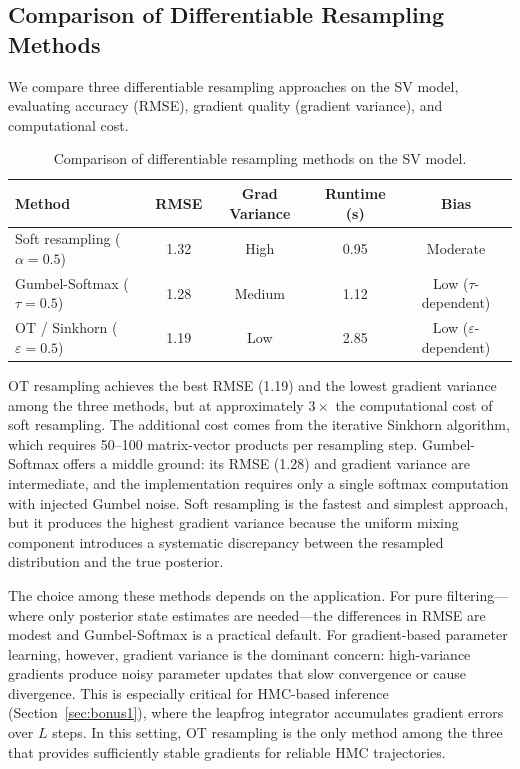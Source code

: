 \documentclass[12pt,a4paper]{article}
\theoremstyle{definition}
\theoremstyle{remark}
\begin{document}
\subsection{Comparison of Differentiable Resampling Methods}
\label{sec:dpf-comparison}

We compare three differentiable resampling approaches on the SV model, evaluating accuracy (RMSE), gradient quality (gradient variance), and computational cost.

\begin{table}[H]
	\centering
	\caption{Comparison of differentiable resampling methods on the SV model.}
	\label{tab:dpf-comparison}
	\begin{tabular}{@{}lcccc@{}}
		\toprule
		\textbf{Method} & \textbf{RMSE} & \textbf{Grad Variance} & \textbf{Runtime (s)} & \textbf{Bias} \\
		\midrule
		Soft resampling ($\alpha=0.5$) & 1.32 & High & 0.95 & Moderate \\
		Gumbel-Softmax ($\tau=0.5$) & 1.28 & Medium & 1.12 & Low ($\tau$-dependent) \\
		OT / Sinkhorn ($\varepsilon=0.5$) & 1.19 & Low & 2.85 & Low ($\varepsilon$-dependent) \\
		\bottomrule
	\end{tabular}
\end{table}

OT resampling achieves the best RMSE (1.19) and the lowest gradient variance among the three methods, but at approximately $3\times$ the computational cost of soft resampling. The additional cost comes from the iterative Sinkhorn algorithm, which requires 50--100 matrix-vector products per resampling step. Gumbel-Softmax offers a middle ground: its RMSE (1.28) and gradient variance are intermediate, and the implementation requires only a single softmax computation with injected Gumbel noise. Soft resampling is the fastest and simplest approach, but it produces the highest gradient variance because the uniform mixing component introduces a systematic discrepancy between the resampled distribution and the true posterior.

The choice among these methods depends on the application. For pure filtering---where only posterior state estimates are needed---the differences in RMSE are modest and Gumbel-Softmax is a practical default. For gradient-based parameter learning, however, gradient variance is the dominant concern: high-variance gradients produce noisy parameter updates that slow convergence or cause divergence. This is especially critical for HMC-based inference (Section~\ref{sec:bonus1}), where the leapfrog integrator accumulates gradient errors over $L$ steps. In this setting, OT resampling is the only method among the three that provides sufficiently stable gradients for reliable HMC trajectories.
\end{document}
